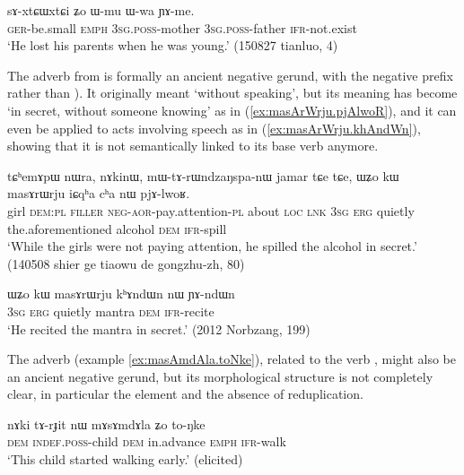 \begin{exe}
\ex \label{ex:sAxtCWtCi.YAme}
\gll sɤ-xtɕɯ\redp{}xtɕi ʑo ɯ-mu ɯ-wa ɲɤ-me. \\
\textsc{ger}-be.small \textsc{emph} \textsc{3sg}.\textsc{poss}-mother  \textsc{3sg}.\textsc{poss}-father \textsc{ifr}-not.exist \\ 
\glt `He lost his parents when he was young.' (150827 tianluo, 4)
\end{exe}

The adverb   from  is formally an ancient negative gerund, with the negative prefix  rather than ). It originally meant `without speaking', but its meaning has become `in secret, without someone knowing' as in (\ref{ex:masArWrju.pjAlwoR}), and it can even be applied to acts involving speech as in (\ref{ex:masArWrju.khAndWn}), showing that it is not semantically linked to its base verb anymore.

\begin{exe}
\ex \label{ex:masArWrju.pjAlwoR}
\gll  tɕʰemɤpɯ nɯra, nɤkinɯ, mɯ-tɤ-rɯndzaŋspa-nɯ jamar tɕe tɕe,
ɯʑo kɯ masɤrɯrju iɕqʰa cʰa nɯ pjɤ-lwoʁ. \\
girl \textsc{dem}:\textsc{pl} \textsc{filler} \textsc{neg}-\textsc{aor}-pay.attention-\textsc{pl} about \textsc{loc} \textsc{lnk} \textsc{3sg} \textsc{erg} quietly the.aforementioned alcohol \textsc{dem} \textsc{ifr}-spill \\
\glt `While the girls were not paying attention, he spilled the alcohol in secret.' (140508 shier ge tiaowu de gongzhu-zh, 80)
\end{exe}

\begin{exe}
\ex \label{ex:masArWrju.khAndWn}
\gll ɯʑo kɯ masɤrɯrju kʰɤndɯn nɯ ɲɤ-ndɯn \\
\textsc{3sg} \textsc{erg} quietly mantra \textsc{dem} \textsc{ifr}-recite \\
\glt `He recited the mantra in secret.' (2012 Norbzang, 199)
\end{exe}

The adverb  (example \ref{ex:masAmdAla.toNke}), related to the verb , might also be an ancient negative gerund, but its morphological structure is not completely clear, in particular the element  and the absence of reduplication. 

\begin{exe}
\ex \label{ex:masAmdAla.toNke}
\gll nɤki tɤ-rɟit nɯ mɤsɤmdɤla ʑo to-ŋke \\
\textsc{dem} \textsc{indef}.\textsc{poss}-child \textsc{dem} in.advance \textsc{emph} \textsc{ifr}-walk \\
\glt `This child started walking early.' (elicited)
\end{exe}

